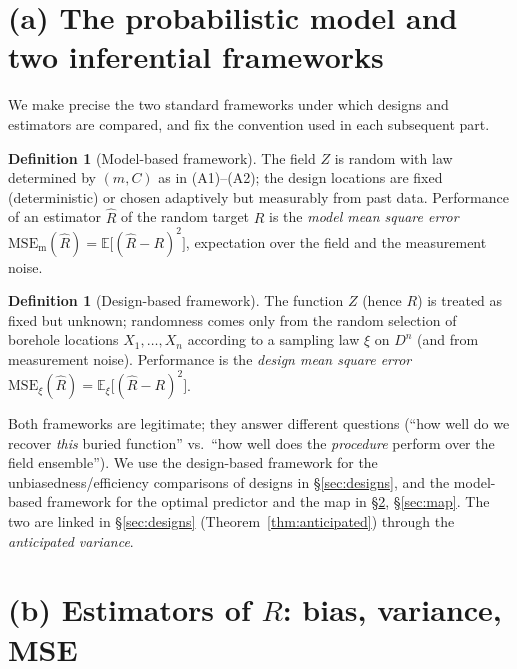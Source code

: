 \documentclass{amsart}
\theoremstyle{definition}
\newtheorem{definition}[theorem]{Definition}
\newcommand{\E}{\mathbb{E}}
\newcommand{\Rhat}{\widehat R}
\begin{document}
\section{(a) The probabilistic model and two inferential frameworks}
\label{sec:model}

We make precise the two standard frameworks under which designs and
estimators are compared, and fix the convention used in each subsequent
part.

\begin{definition}[Model-based framework]\label{def:modelbased}
The field $Z$ is random with law determined by $(m,C)$ as in (A1)--(A2);
the design locations are fixed (deterministic) or chosen adaptively but
measurably from past data. Performance of an estimator $\Rhat$ of the
random target $R$ is the \emph{model mean square error}
$\mathrm{MSE}_{\mathrm{m}}(\Rhat)=\E\big[(\Rhat-R)^2\big]$, expectation
over the field and the measurement noise.
\end{definition}

\begin{definition}[Design-based framework]\label{def:designbased}
The function $Z$ (hence $R$) is treated as fixed but unknown; randomness
comes only from the random selection of borehole locations
$X_1,\dots,X_n$ according to a sampling law $\xi$ on $D^n$ (and from
measurement noise). Performance is the \emph{design mean square error}
$\mathrm{MSE}_{\xi}(\Rhat)=\E_\xi\big[(\Rhat-R)^2\big]$.
\end{definition}

Both frameworks are legitimate; they answer different questions
(``how well do we recover \emph{this} buried function'' vs.\ ``how well does
the \emph{procedure} perform over the field ensemble''). We use the
design-based framework for the unbiasedness/efficiency comparisons of
designs in \S\ref{sec:designs}, and the model-based framework for the
optimal predictor and the map in \S\ref{sec:estimator}, \S\ref{sec:map}.
The two are linked in \S\ref{sec:designs} (Theorem~\ref{thm:anticipated})
through the \emph{anticipated variance}.

\section{(b) Estimators of $R$: bias, variance, MSE}
\label{sec:estimator}
\end{document}
